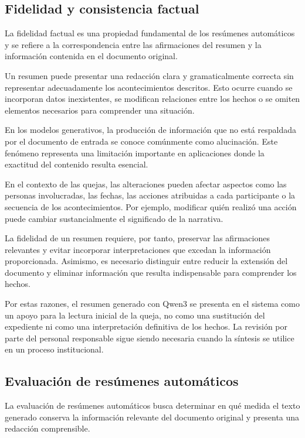 \subsection{Fidelidad y consistencia factual}

La fidelidad factual es una propiedad fundamental de los resúmenes automáticos y se refiere a la correspondencia entre las afirmaciones del resumen y la información contenida en el documento original.

Un resumen puede presentar una redacción clara y gramaticalmente correcta sin representar adecuadamente los acontecimientos descritos. Esto ocurre cuando se incorporan datos inexistentes, se modifican relaciones entre los hechos o se omiten elementos necesarios para comprender una situación.

En los modelos generativos, la producción de información que no está respaldada por el documento de entrada se conoce comúnmente como alucinación. Este fenómeno representa una limitación importante en aplicaciones donde la exactitud del contenido resulta esencial.

En el contexto de las quejas, las alteraciones pueden afectar aspectos como las personas involucradas, las fechas, las acciones atribuidas a cada participante o la secuencia de los acontecimientos. Por ejemplo, modificar quién realizó una acción puede cambiar sustancialmente el significado de la narrativa.

La fidelidad de un resumen requiere, por tanto, preservar las afirmaciones relevantes y evitar incorporar interpretaciones que excedan la información proporcionada. Asimismo, es necesario distinguir entre reducir la extensión del documento y eliminar información que resulta indispensable para comprender los hechos.

Por estas razones, el resumen generado con Qwen3 se presenta en el sistema como un apoyo para la lectura inicial de la queja, no como una sustitución del expediente ni como una interpretación definitiva de los hechos. La revisión por parte del personal responsable sigue siendo necesaria cuando la síntesis se utilice en un proceso institucional.

\subsection{Evaluación de resúmenes automáticos}

La evaluación de resúmenes automáticos busca determinar en qué medida el texto generado conserva la información relevante del documento original y presenta una redacción comprensible.


